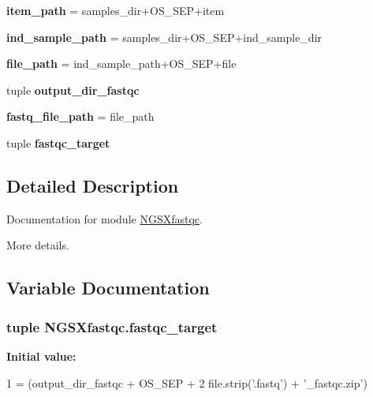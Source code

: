 \begin{DoxyCompactItemize}
\item 
{\bfseries item\+\_\+path} = samples\+\_\+dir+O\+S\+\_\+\+S\+EP+item\hypertarget{namespaceNGSXfastqc_a162797ed078002fb8387b098a6283b77}{}\label{namespaceNGSXfastqc_a162797ed078002fb8387b098a6283b77}

\item 
{\bfseries ind\+\_\+sample\+\_\+path} = samples\+\_\+dir+O\+S\+\_\+\+S\+EP+ind\+\_\+sample\+\_\+dir\hypertarget{namespaceNGSXfastqc_a4de99da68b3c4c2aa7d03f9336bc96c2}{}\label{namespaceNGSXfastqc_a4de99da68b3c4c2aa7d03f9336bc96c2}

\item 
{\bfseries file\+\_\+path} = ind\+\_\+sample\+\_\+path+O\+S\+\_\+\+S\+EP+file\hypertarget{namespaceNGSXfastqc_a1494d77bfeeb8e113862af4525488015}{}\label{namespaceNGSXfastqc_a1494d77bfeeb8e113862af4525488015}

\item 
tuple {\bfseries output\+\_\+dir\+\_\+fastqc}
\item 
{\bfseries fastq\+\_\+file\+\_\+path} = file\+\_\+path\hypertarget{namespaceNGSXfastqc_af00085314979baa19555ec7fb44d9f20}{}\label{namespaceNGSXfastqc_af00085314979baa19555ec7fb44d9f20}

\item 
tuple {\bfseries fastqc\+\_\+target}
\end{DoxyCompactItemize}


\subsection{Detailed Description}
Documentation for module \hyperlink{namespaceNGSXfastqc}{N\+G\+S\+Xfastqc}. 

More details. 

\subsection{Variable Documentation}
\subsubsection[{\texorpdfstring{fastqc\+\_\+target}{fastqc_target}}]{\setlength{\rightskip}{0pt plus 5cm}tuple N\+G\+S\+Xfastqc.\+fastqc\+\_\+target}\hypertarget{namespaceNGSXfastqc_acf07e35149177756ad2080481914691b}{}\label{namespaceNGSXfastqc_acf07e35149177756ad2080481914691b}
{\bfseries Initial value\+:}
\begin{DoxyCode}
1 = (output\_dir\_fastqc + OS\_SEP +
2                             file.strip(\textcolor{stringliteral}{'.fastq'}) + \textcolor{stringliteral}{'\_fastqc.zip'})
\end{DoxyCode}

